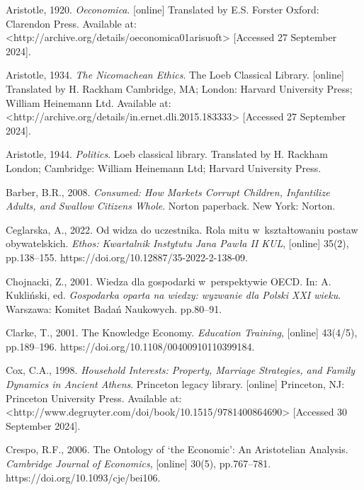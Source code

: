 Aristotle, 1920. \textit{Oeconomica}. [online] Translated by E.S. Forster Oxford: Clarendon Press. Available at: {\textless}http://archive.org/details/oeconomica01arisuoft{\textgreater} [Accessed 27 September 2024].



Aristotle, 1934. \textit{The Nicomachean Ethics}. The Loeb Classical Library. [online] Translated by H. Rackham Cambridge, MA; London: Harvard University Press; William Heinemann Ltd. Available at: {\textless}http://archive.org/details/in.ernet.dli.2015.183333{\textgreater} [Accessed 27 September 2024].



Aristotle, 1944. \textit{Politics}. Loeb classical library. Translated by H. Rackham London; Cambridge: William Heinemann Ltd; Harvard University Press.



Barber, B.R., 2008. \textit{Consumed: How Markets Corrupt Children, Infantilize Adults, and Swallow Citizens Whole}. Norton paperback. New York: Norton.



Ceglarska, A., 2022. Od widza do uczestnika. Rola mitu w~kształtowaniu postaw obywatelskich. \textit{Ethos: Kwartalnik Instytutu Jana Pawła II KUL}, [online] 35(2), pp.138–155. https://doi.org/10.12887/35-2022-2-138-09.



Chojnacki, Z., 2001. Wiedza dla gospodarki w~perspektywie OECD. In: A. Kukliński, ed. \textit{Gospodarka oparta na wiedzy: wyzwanie dla Polski XXI wieku}. Warszawa: Komitet Badań Naukowych. pp.80–91.



Clarke, T., 2001. The Knowledge Economy. \textit{Education Training}, [online] 43(4/5), pp.189–196. https://doi.org/10.1108/00400910110399184.



Cox, C.A., 1998. \textit{Household Interests: Property, Marriage Strategies, and Family Dynamics in Ancient Athens}. Princeton legacy library. [online] Princeton, NJ: Princeton University Press. Available at: {\textless}http://www.degruyter.com/doi/book/10.1515/9781400864690{\textgreater} [Accessed 30 September 2024].



Crespo, R.F., 2006. The Ontology of ‘the Economic': An Aristotelian Analysis. \textit{Cambridge Journal of Economics}, [online] 30(5), pp.767–781. https://doi.org/10.1093/cje/bei106.



